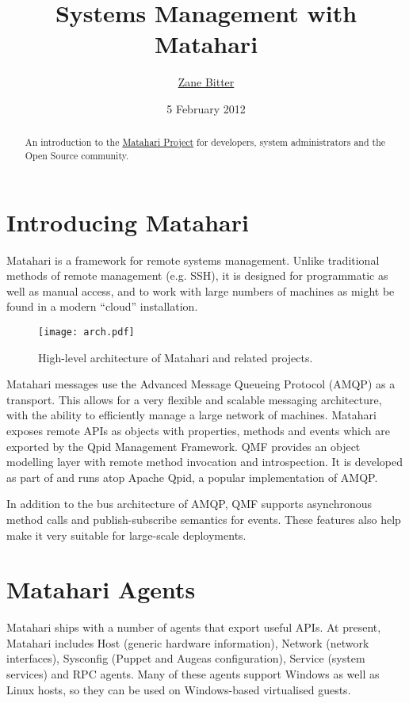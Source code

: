 \documentclass{tufte-handout}
\title{Systems Management with Matahari}
\author{\href{mailto:zbitter@redhat.com}{Zane Bitter}}
\date{5 February 2012}
\begin{document}
\maketitle

\marginnote{\tableofcontents \vspace{2em}}

\begin{abstract}
An introduction to the \href{http://matahariproject.org}{Matahari Project} for developers, system administrators and the Open Source community.
\end{abstract}

\section{Introducing Matahari}

Matahari is a framework for remote systems management. Unlike traditional methods of remote management (e.g. SSH), it is designed for programmatic as well as manual access, and to work with large numbers of machines as might be found in a modern ``cloud'' installation.

\begin{figure*}[b!]
\texttt{[image: arch.pdf]}
\caption{High-level architecture of Matahari and related projects.}
\label{fig:arch}
\end{figure*}

Matahari messages use the Advanced Message Queueing Protocol (AMQP) as a transport. This allows for a very flexible and scalable messaging architecture, with the ability to efficiently manage a large network of machines.
Matahari exposes remote APIs as objects with properties, methods and events which are exported by the Qpid Management Framework. QMF provides an object modelling layer with remote method invocation and introspection. It is developed as part of and runs atop Apache Qpid, a popular implementation of AMQP.

In addition to the bus architecture of AMQP, QMF supports asynchronous method calls and publish-subscribe semantics for events. These features also help make it very suitable for large-scale deployments.

\section{Matahari Agents}

Matahari ships with a number of agents that export useful APIs. At present, Matahari includes Host (generic hardware information), Network (network interfaces), Sysconfig (Puppet and Augeas configuration), Service (system services) and RPC agents.
Many of these agents support Windows as well as Linux hosts, so they can be used on Windows-based virtualised guests.
\end{document}
